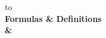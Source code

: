 \documentclass[10pt,a4paper]{article}
\begin{document}
\begin{tabu} to \textwidth{|X[c]|X[c]|} \hline
   \\ \hline
  \rowfont\bfseries Formulas & Definitions \\ \hline
   &  \\ \hline
\end{tabu}
\end{document}
